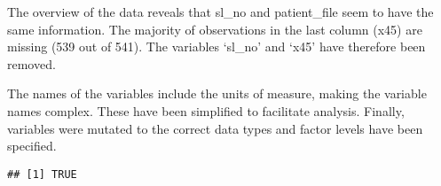 \documentclass[
]{article}
\newenvironment{Shaded}{\begin{snugshade}}{\end{snugshade}}
\newcommand{\CommentTok}[1]{\textcolor[rgb]{0.56,0.35,0.01}{\textit{#1}}}
\newcommand{\FunctionTok}[1]{\textcolor[rgb]{0.00,0.00,0.00}{#1}}
\newcommand{\NormalTok}[1]{#1}
\newcommand{\SpecialCharTok}[1]{\textcolor[rgb]{0.00,0.00,0.00}{#1}}
\begin{document}
The overview of the data reveals that sl\_no and patient\_file seem to
have the same information. The majority of observations in the last
column (x45) are missing (539 out of 541). The variables `sl\_no' and
`x45' have therefore been removed.

The names of the variables include the units of measure, making the
variable names complex. These have been simplified to facilitate
analysis. Finally, variables were mutated to the correct data types and
factor levels have been specified.

\begin{Shaded}
\end{Shaded}

\begin{verbatim}
## [1] TRUE
\end{verbatim}
\end{document}
